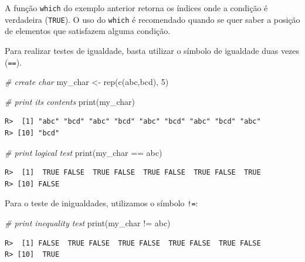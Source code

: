 \documentclass[
  11pt,
]{book}
\newenvironment{Shaded}{\begin{snugshade}}{\end{snugshade}}
\newcommand{\CommentTok}[1]{\textcolor[rgb]{0.37,0.37,0.37}{\textit{#1}}}
\newcommand{\DecValTok}[1]{\textcolor[rgb]{0.06,0.06,0.06}{#1}}
\newcommand{\FunctionTok}[1]{\textcolor[rgb]{0,0,0}{#1}}
\newcommand{\NormalTok}[1]{#1}
\newcommand{\OtherTok}[1]{\textcolor[rgb]{0.37,0.37,0.37}{#1}}
\newcommand{\SpecialCharTok}[1]{\textcolor[rgb]{0,0,0}{#1}}
\newcommand{\StringTok}[1]{\textcolor[rgb]{0.5,0.5,0.5}{#1}}
\begin{document}
A função \texttt{which} do exemplo anterior retorna os índices onde a condição é verdadeira (\texttt{TRUE}). O uso do \texttt{which} é recomendado quando se quer saber a posição de elementos que satisfazem alguma condição.

Para realizar testes de igualdade, basta utilizar o símbolo de igualdade duas vezes (\texttt{==}).

\begin{Shaded}
\begin{Highlighting}[]
\CommentTok{\# create char}
\NormalTok{my\_char }\OtherTok{\textless{}{-}} \FunctionTok{rep}\NormalTok{(}\FunctionTok{c}\NormalTok{(}\StringTok{\textquotesingle{}abc\textquotesingle{}}\NormalTok{,}\StringTok{\textquotesingle{}bcd\textquotesingle{}}\NormalTok{), }\DecValTok{5}\NormalTok{)}

\CommentTok{\# print its contents}
\FunctionTok{print}\NormalTok{(my\_char)}
\end{Highlighting}
\end{Shaded}

\begin{verbatim}
R>  [1] "abc" "bcd" "abc" "bcd" "abc" "bcd" "abc" "bcd" "abc"
R> [10] "bcd"
\end{verbatim}

\begin{Shaded}
\begin{Highlighting}[]
\CommentTok{\# print logical test}
\FunctionTok{print}\NormalTok{(my\_char }\SpecialCharTok{==} \StringTok{\textquotesingle{}abc\textquotesingle{}}\NormalTok{)}
\end{Highlighting}
\end{Shaded}

\begin{verbatim}
R>  [1]  TRUE FALSE  TRUE FALSE  TRUE FALSE  TRUE FALSE  TRUE
R> [10] FALSE
\end{verbatim}

Para o teste de inigualdades, utilizamos o símbolo \texttt{!=}:

\begin{Shaded}
\begin{Highlighting}[]
\CommentTok{\# print inequality test}
\FunctionTok{print}\NormalTok{(my\_char }\SpecialCharTok{!=} \StringTok{\textquotesingle{}abc\textquotesingle{}}\NormalTok{)}
\end{Highlighting}
\end{Shaded}

\begin{verbatim}
R>  [1] FALSE  TRUE FALSE  TRUE FALSE  TRUE FALSE  TRUE FALSE
R> [10]  TRUE
\end{verbatim}
\end{document}
